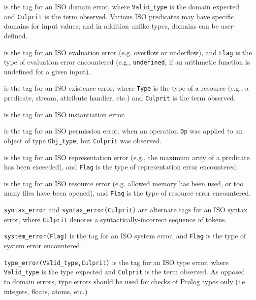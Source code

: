 \begin{description}
\item[{\tt domain\_error(Valid\_type,Culprit)}] is the tag for an ISO
  domain error, where {\tt Valid\_type} is the domain expected and
  {\tt Culprit} is the term observed.  Various ISO predicates may have
  specific domains for input values; and in addition unlike types,
  domains can be user-defined.
%
\item[{\tt evaluation\_error(Flag)}] is the tag for an ISO evaluation
  error (e.g. overflow or underflow), and {\tt Flag} is the type of
  evaluation error encountered (e.g., {\tt undefined}, if an
  arithmetic function is undefined for a given input).
%
\item[{\tt existence\_error(Type,Culprit)}] is the tag for an ISO
  existence error, where {\tt Type} is the type of a resource (e.g., a
  predicate, stream, attribute handler, etc.) and {\tt Culprit} is the
  term observed.
%
\item[{\tt instantiation\_error}] is the tag for an ISO instantiation
  error.
%
\item[{\tt permission\_error(Op,Obj\_type,Culprit)}] is the tag for an ISO
  permission error, when an operation {\tt Op} was applied to an
  object of type {\tt Obj\_type}, but {\tt Culprit} was observed.
%
\item[{\tt representation\_error(Flag)}] is the tag for an ISO
  representation error (e.g., the maximum arity of a predicate has
  been exceeded), and {\tt Flag} is the type of representation error
  encountered.
%
\item[{\tt resource\_error(Flag)}] is the tag for an ISO resource error
  (e.g. allowed memory has been used, or too many files have been
  opened), and {\tt Flag} is the type of resource error encountered.
%
\item {\tt syntax\_error} and {\tt syntax\_error(Culprit)} are alternate
  tags for an ISO syntax error, where {\tt Culprit} denotes a
  syntactically-incorrect sequence of tokens.
%
\item {\tt system\_error(Flag)} is the tag for an ISO system
  error, and {\tt Flag} is the type of system error encountered.
%
\item {\tt type\_error(Valid\_type,Culprit)} is the tag for an
  ISO type error, where {\tt Valid\_type} is the type expected and
  {\tt Culprit} is the term observed.  As opposed to domain errors,
  type errors should be used for checks of Prolog types only
  (i.e. integers, floats, atoms, etc.)
%
\end{description}

